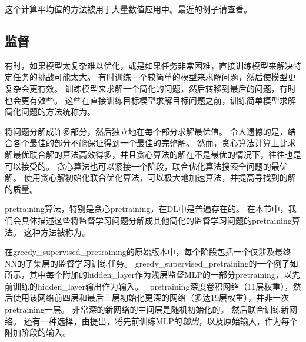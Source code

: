 这个计算平均值的方法被用于大量数值应用中。最近的例子请查看\cite{Szegedy-et-al-2015}。

\subsection{监督}
\label{sec:supervised_pretraining}
有时，如果模型太复杂难以优化，或是如果任务非常困难，直接训练模型来解决特定任务的挑战可能太大。
有时训练一个较简单的模型来求解问题，然后使模型更复杂会更有效。
训练模型来求解一个简化的问题，然后转移到最后的问题，有时也会更有效些。
这些在直接训练目标模型求解目标问题之前，训练简单模型求解简化问题的方法统称为。


将问题分解成许多部分，然后独立地在每个部分求解最优值。
令人遗憾的是，结合各个最佳的部分不能保证得到一个最佳的完整解。
然而，贪心算法计算上比求解最优联合解的算法高效得多，并且贪心算法的解在不是最优的情况下，往往也是可以接受的。
贪心算法也可以紧接一个阶段，联合优化算法搜索全问题的最优解。
使用贪心解初始化联合优化算法，可以极大地加速算法，并提高寻找到的解的质量。

\gls{pretraining}算法，特别是贪心\gls{pretraining}，在\gls{DL}中是普遍存在的。
在本节中，我们会具体描述这些将监督学习问题分解成其他简化的监督学习问题的\gls{pretraining}算法。
这种方法被称为。


在\gls{greedy_supervised_pretraining}的原始版本\citep{Bengio-et-al-2007}中，每个阶段包括一个仅涉及最终\gls{NN}的子集层的监督学习训练任务。
\gls{greedy_supervised_pretraining}的一个例子如所示，其中每个附加的\gls{hidden_layer}作为浅层监督\gls{MLP}的一部分\gls{pretraining}，以先前训练的\gls{hidden_layer}输出作为输入。
\cite{Simonyan-Zisserman-2015}~\gls{pretraining}深度卷积网络（11层权重），然后使用该网络前四层和最后三层初始化更深的网络（多达19层权重），并非一次\gls{pretraining}一层。
非常深的新网络的中间层是随机初始化的。
然后联合训练新网络。
还有一种选择，由\cite{Yu-et-al-2010}提出，将先前训练\gls{MLP}的\emph{输出}，以及原始输入，作为每个附加阶段的输入。

